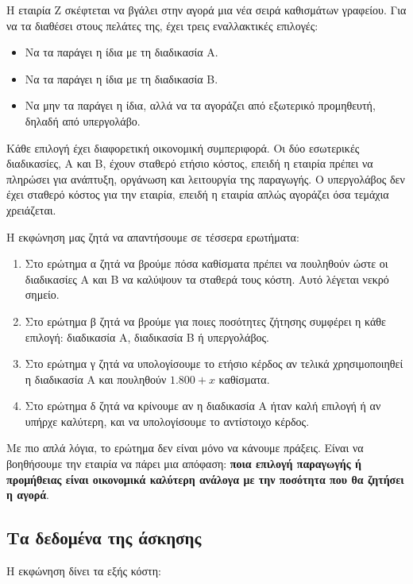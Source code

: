 \documentclass[12pt,a4paper]{article}
\begin{document}
Η εταιρία Ζ σκέφτεται να βγάλει στην αγορά μια νέα σειρά καθισμάτων γραφείου. Για να τα διαθέσει στους πελάτες της, έχει τρεις εναλλακτικές επιλογές:

\begin{itemize}
    \item Να τα παράγει η ίδια με τη διαδικασία Α.
    \item Να τα παράγει η ίδια με τη διαδικασία Β.
    \item Να μην τα παράγει η ίδια, αλλά να τα αγοράζει από εξωτερικό προμηθευτή, δηλαδή από υπεργολάβο.
\end{itemize}

Κάθε επιλογή έχει διαφορετική οικονομική συμπεριφορά. Οι δύο εσωτερικές διαδικασίες, Α και Β, έχουν σταθερό ετήσιο κόστος, επειδή η εταιρία πρέπει να πληρώσει για ανάπτυξη, οργάνωση και λειτουργία της παραγωγής. Ο υπεργολάβος δεν έχει σταθερό κόστος για την εταιρία, επειδή η εταιρία απλώς αγοράζει όσα τεμάχια χρειάζεται.

Η εκφώνηση μας ζητά να απαντήσουμε σε τέσσερα ερωτήματα:

\begin{enumerate}
    \item Στο ερώτημα α ζητά να βρούμε πόσα καθίσματα πρέπει να πουληθούν ώστε οι διαδικασίες Α και Β να καλύψουν τα σταθερά τους κόστη. Αυτό λέγεται νεκρό σημείο.
    \item Στο ερώτημα β ζητά να βρούμε για ποιες ποσότητες ζήτησης συμφέρει η κάθε επιλογή: διαδικασία Α, διαδικασία Β ή υπεργολάβος.
    \item Στο ερώτημα γ ζητά να υπολογίσουμε το ετήσιο κέρδος αν τελικά χρησιμοποιηθεί η διαδικασία Α και πουληθούν \(1.800+x\) καθίσματα.
    \item Στο ερώτημα δ ζητά να κρίνουμε αν η διαδικασία Α ήταν καλή επιλογή ή αν υπήρχε καλύτερη, και να υπολογίσουμε το αντίστοιχο κέρδος.
\end{enumerate}

Με πιο απλά λόγια, το ερώτημα δεν είναι μόνο να κάνουμε πράξεις. Είναι να βοηθήσουμε την εταιρία να πάρει μια απόφαση: \textbf{ποια επιλογή παραγωγής ή προμήθειας είναι οικονομικά καλύτερη ανάλογα με την ποσότητα που θα ζητήσει η αγορά}.

\subsection{Τα δεδομένα της άσκησης}

Η εκφώνηση δίνει τα εξής κόστη:
\end{document}
